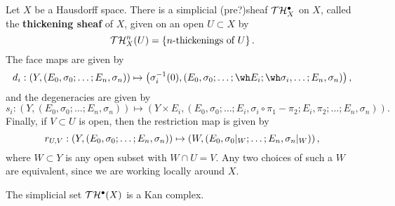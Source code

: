 
Let $X$ be a Hausdorff space. There is a simplicial (pre?)sheaf $\mathcal T \mathcal H_X^\bullet$ on $X$, called the {\bf thickening sheaf} of $X$, given on an open $U \subset X$ by
\[ \mathcal T \mathcal H_X^n(U) = \left\{ \text{$n$-thickenings of $U$} \right\}. \]
The face maps are given by
\[ d_i : \left( Y, (E_0, \sigma_0; \dots; E_n, \sigma_n) \right) \mapsto \left( \sigma_i^{-1}(0), (E_0, \sigma_0; \dots; \wh E_i; \wh \sigma_i, \dots ; E_n, \sigma_n) \right), \]
and the degeneracies are given by
\[ s_i : \left( Y, (E_0, \sigma_0; \dots; E_n, \sigma_n) \right) \mapsto \left( Y \times E_i, (E_0, \sigma_0; \dots; E_i, \sigma_i \circ \pi_1 - \pi_2; E_i, \pi_2; \dots; E_n, \sigma_n) \right). \]
Finally, if $V \subset U$ is open, then the restriction map is given by
\[ r_{U, V}: \left( Y, (E_0, \sigma_0; \dots; E_n, \sigma_n) \right) \mapsto \left( W, (E_0, {\sigma_0|_{W}}; \dots; E_n, {\sigma_n|_{W}}) \right), \]
where $W \subset Y$ is any open subset with $W \cap U = V$. Any two choices of such a $W$ are equivalent, since we are working locally around $X$.

\begin{prop}\label{thickenings-are-kan-complexes}
The simplicial set $\mathcal T \mathcal H^\bullet(X)$ is a Kan complex.
\end{prop}

